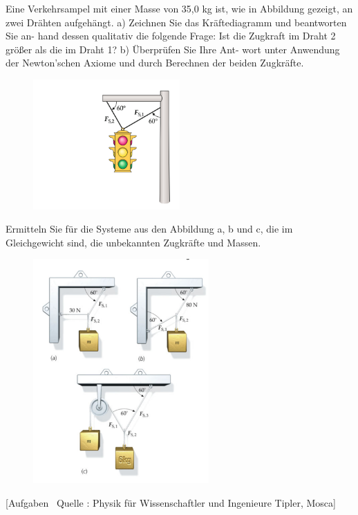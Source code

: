 \documentclass[addpoints,12pt]{exam} %
\begin{document}
\begin{questions}
\question Eine Verkehrsampel mit einer Masse von 35,0 kg ist, wie in Abbildung gezeigt, an zwei Drähten aufgehängt. a) Zeichnen Sie das Kräftediagramm und beantworten Sie an- hand dessen qualitativ die folgende Frage: Ist die Zugkraft im Draht 2 größer als die im Draht 1? b) Überprüfen Sie Ihre Ant- wort unter Anwendung der Newton’schen Axiome und durch Berechnen der beiden Zugkräfte.
\begin{figure}[h]
    \hspace{9cm}
\includegraphics[width=0.5\textwidth]{auf3}
\end{figure}
\pagebreak

\question Ermitteln Sie für die Systeme aus den Abbildung a, b und c, die im Gleichgewicht sind, die unbekannten Zugkräfte und Massen.
\begin{figure}[h]
\includegraphics[width=0.6\textwidth]{auf4}
\end{figure}


[Aufgaben  Quelle : Physik für Wissenschaftler und Ingenieure Tipler, Mosca]

\end{questions}
\end{document}
